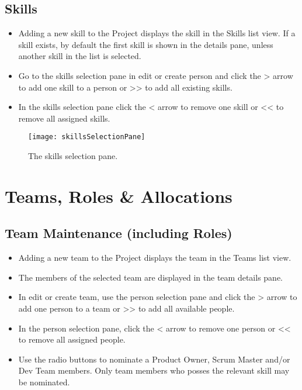 \documentclass[11pt,fleqn]{book} %
\begin{document}
\subsection{Skills}
\begin{itemize}
  \item Adding a new skill to the Project displays the skill in the Skills list view. If a skill exists, by default the first skill is shown in the details pane, unless another skill in the list is selected.
  \item Go to the skills selection pane in edit or create person and click the > arrow to add one skill to a person or >> to add all existing skills.
  \item In the skills selection pane click the < arrow to remove one skill or << to remove all assigned skills.
\end{itemize}

\begin{figure}[H]
  \centering
  \texttt{[image: skillsSelectionPane]}
  \caption{The skills selection pane.\label{skillsSelectionPane}}
\end{figure}

\section{Teams, Roles \& Allocations}
\subsection{Team Maintenance (including Roles)}
\begin{itemize}
  \item Adding a new team to the Project displays the team in the Teams list view.
  \item The members of the selected team are displayed in the team details pane.
  \item In edit or create team, use the person selection pane and click the > arrow to add one person to a team or >> to add all available people.
  \item In the person selection pane, click the < arrow to remove one person or << to remove all assigned people.
  \item Use the radio buttons to nominate a Product Owner, Scrum Master and/or Dev Team members. Only team members who posses the relevant skill may be nominated.
\end{itemize}
\end{document}
